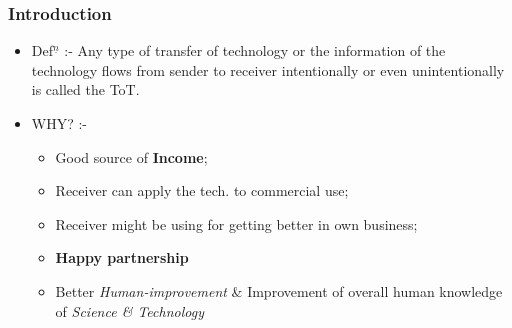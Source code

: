 \begin{frame}
\frametitle{Introduction}
\begin{itemize}
	\item Def$^\underline{n}$ :- Any type of transfer of technology or the information of the technology flows from sender to receiver intentionally or even unintentionally is called the ToT.
	\item WHY? :- 
	\begin{itemize}
		\item Good source of \textbf{Income};
		\item Receiver can apply the tech. to commercial use;
		\item Receiver might be using for getting better in own business;
		\item \textbf{Happy partnership}
		\item Better \textit{Human-improvement} \& Improvement of overall human knowledge of \textit{Science \& Technology}
	\end{itemize}
\end{itemize}
\end{frame}
